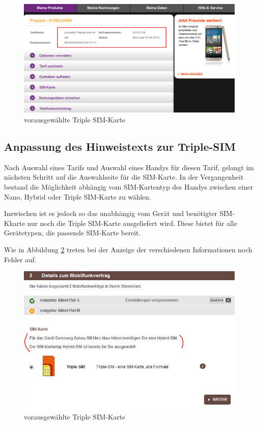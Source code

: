 \documentclass[11pt,a4paper]{article} %
\begin{document}
\begin{figure}[h] \label{fig:triple}
\includegraphics[width=\textwidth]{images/csc.PNG}
\caption{vorausgewählte Triple SIM-Karte \cite{ccpp}}
\centering
\end{figure}


\subsection{Anpassung des Hinweistexts zur Triple-SIM} 

Nach Auswahl eines Tarifs und Auswahl eines Handys für diesen Tarif, gelangt im nächsten Schritt 
auf die Auswahlseite für die SIM-Karte. In der Vergangenheit bestand die Möglichkeit abhängig vom
SIM-Kartentyp des Handys zwischen einer Nano, Hybrid oder Triple SIM-Karte zu wählen.

Inzwischen ist es jedoch so das unabhängig vom Gerät und benötigter SIM-Kkarte nur noch die Triple SIM-Karte
ausgeliefert wird. Diese bietet für alle Gerätetypen, die passende SIM-Karte bereit.

Wie in Abbildung \ref{fig:triple} treten bei der Anzeige der verschiedenen Informationen noch Fehler auf.
\begin{figure}[h] \label{fig:triple}
\includegraphics[width=\textwidth]{images/triple.PNG}
\caption{vorausgewählte Triple SIM-Karte \cite{ccpp}}
\centering
\end{figure}
\end{document}
